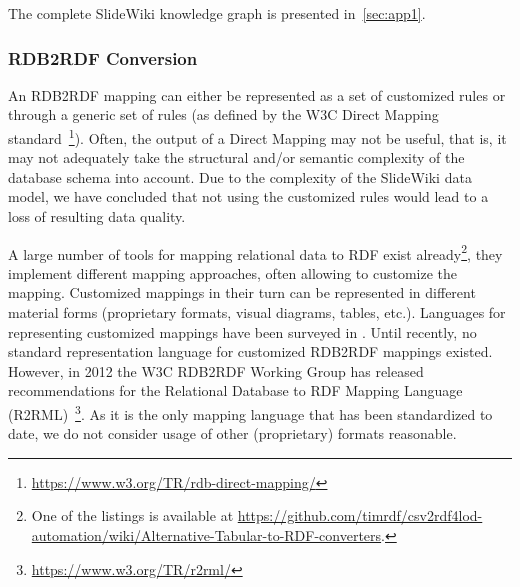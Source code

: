 \documentclass[ngerman,UKenglish,table]{scrbook}
\begin{document}
The complete SlideWiki knowledge graph is presented in~\autoref{sec:app1}.

\subsubsection{RDB2RDF Conversion}
\label{sec:RDB2RDF}

An RDB2RDF mapping can either be represented as a set of customized rules or through a generic set of rules (as defined by the W3C Direct Mapping standard~\footnote{\url{https://www.w3.org/TR/rdb-direct-mapping/}}).
Often, the output of a Direct Mapping may not be useful, that is, it may not adequately take the structural and/or semantic complexity of the database schema into account.
Due to the complexity of the SlideWiki data model, we have concluded that not using the customized rules would lead to a loss of resulting data quality. 

A large number of tools for mapping relational data to RDF exist already\footnote{One of the listings is available at \url{https://github.com/timrdf/csv2rdf4lod-automation/wiki/Alternative-Tabular-to-RDF-converters}.}, they implement different mapping approaches, often allowing to customize the mapping. Customized mappings in their turn can be represented in different material forms (proprietary formats, visual diagrams, tables, etc.).
Languages for representing customized mappings have been surveyed in \cite{spanos2012bringing}.
Until recently, no standard representation language for customized RDB2RDF mappings existed.
However, in 2012 the W3C RDB2RDF Working Group has released recommendations for the Relational Database to RDF Mapping Language (R2RML)~\footnote{\url{https://www.w3.org/TR/r2rml/}}.
As it is the only mapping language that has been standardized to date, we do not consider usage of other (proprietary) formats reasonable. 
\end{document}

